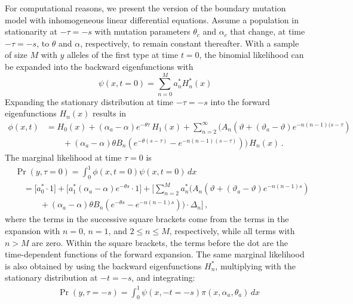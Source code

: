 \documentclass[preprint]{elsarticle}
\begin{document}
{For computational reasons, we present the version of the boundary mutation model with inhomogeneous linear differential equations. Assume a population in stationarity at $-\tau=-s$ with mutation parameters $\theta_c$ and $\alpha_c$ that change, at time $-\tau=-s$, to $\theta$ and $\alpha$, respectively, to remain constant thereafter. With a sample of size $M$ with $y$ alleles of the first type at time $t=0$, the binomial likelihood can be expanded into the backward eigenfunctions with 
\begin{equation}
    \psi(x,t=0)=\sum_{n=0}^M a_n^{*} H_n^{*}(x)
\end{equation}
Expanding the stationary distribution at time $-\tau=-s$ into the forward eigenfunctions $H_n(x)$ results in
\begin{equation}
\begin{split}
    \phi(x,t)&= H_0(x)+(\alpha_a-\alpha) e^{-\theta \tau}\,H_1(x)+\sum_{n=2}^\infty \bigg(A_n(\vartheta+(\vartheta_a-\vartheta) e^{-n(n-1)(s-\tau})\\
    &\qquad+(\alpha_a-\alpha) \theta B_n (e^{-\theta (s-\tau)}-e^{-n(n-1) (s-\tau)})\bigg)\,H_n(x)\,.
\end{split}
\end{equation}
The marginal likelihood at time $\tau=0$ is
\begin{equation}
\begin{split}
    &\Pr(y,\tau=0)=\int_0^1 \phi(x,t=0)\psi(x,t=0)\,dx\\
    &\quad=\bigg[a_0^{*}\cdot 1\bigg]+\bigg[a_1^{*}(\alpha_a-\alpha) e^{-\theta s}\cdot 1\bigg]+\bigg[\sum_{n=2}^M a_n^{*}\bigg(A_n(\vartheta+(\vartheta_a-\vartheta) e^{-n(n-1)s}) \\
    &\quad\qquad+(\alpha_a-\alpha)\theta B_n (e^{-\theta s}-e^{-n(n-1) s})\bigg)\cdot\Delta_n\bigg]\,,\
\end{split}
\end{equation}
where the terms in the successive square brackets come from the terms in the expansion with $n=0$, $n=1$, and $2\leq n\leq M$, respectively, while all terms with $n>M$ are zero. Within the square brackets, the terms before the dot are the time-dependent functions of the forward expansion. The same marginal likelihood is also obtained by using the backward eigenfunctions $H_n^{*}$, multiplying with the stationary distribution at $-t=-s$, and integrating:
\begin{equation}
\begin{split}
    &\Pr(y,\tau=-s)=\int_0^1 \psi(x,-t=-s)\pi(x,\alpha_a,\theta_a)\,dx\\

\end{split}
\end{equation}}
\end{document}
